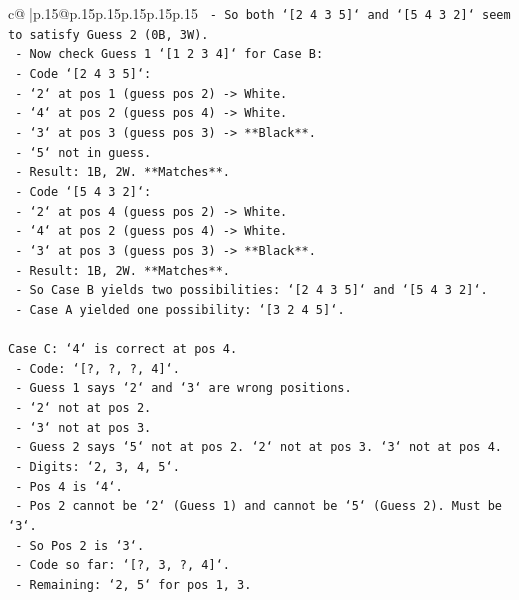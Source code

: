 \documentclass{article}
\begin{document}
{\begin{supertabular}{c@{$\;$}|p{.15\linewidth}@{}p{.15\linewidth}p{.15\linewidth}p{.15\linewidth}p{.15\linewidth}p{.15\linewidth}}
{{{\texttt{     {-} So both `{[}2 4 3 5{]}` and `{[}5 4 3 2{]}` seem to satisfy Guess 2 (0B, 3W).} \\
\texttt{   {-} Now check Guess 1 `{[}1 2 3 4{]}` for Case B:} \\
\texttt{     {-} Code `{[}2 4 3 5{]}`:} \\
\texttt{       {-} `2` at pos 1 (guess pos 2) {-}> White.} \\
\texttt{       {-} `4` at pos 2 (guess pos 4) {-}> White.} \\
\texttt{       {-} `3` at pos 3 (guess pos 3) {-}> **Black**.} \\
\texttt{       {-} `5` not in guess.} \\
\texttt{       {-} Result: 1B, 2W. **Matches**.} \\
\texttt{     {-} Code `{[}5 4 3 2{]}`:} \\
\texttt{       {-} `2` at pos 4 (guess pos 2) {-}> White.} \\
\texttt{       {-} `4` at pos 2 (guess pos 4) {-}> White.} \\
\texttt{       {-} `3` at pos 3 (guess pos 3) {-}> **Black**.} \\
\texttt{       {-} Result: 1B, 2W. **Matches**.} \\
\texttt{   {-} So Case B yields two possibilities: `{[}2 4 3 5{]}` and `{[}5 4 3 2{]}`.} \\
\texttt{   {-} Case A yielded one possibility: `{[}3 2 4 5{]}`.} \\
\\ 
\texttt{Case C: `4` is correct at pos 4.} \\
\texttt{   {-} Code: `{[}?, ?, ?, 4{]}`.} \\
\texttt{   {-} Guess 1 says `2` and `3` are wrong positions.} \\
\texttt{     {-} `2` not at pos 2.} \\
\texttt{     {-} `3` not at pos 3.} \\
\texttt{   {-} Guess 2 says `5` not at pos 2. `2` not at pos 3. `3` not at pos 4.} \\
\texttt{   {-} Digits: `2, 3, 4, 5`.} \\
\texttt{   {-} Pos 4 is `4`.} \\
\texttt{   {-} Pos 2 cannot be `2` (Guess 1) and cannot be `5` (Guess 2). Must be `3`.} \\
\texttt{   {-} So Pos 2 is `3`.} \\
\texttt{   {-} Code so far: `{[}?, 3, ?, 4{]}`.} \\
\texttt{   {-} Remaining: `2, 5` for pos 1, 3.} \\
}}}
\end{supertabular}}
\end{document}
